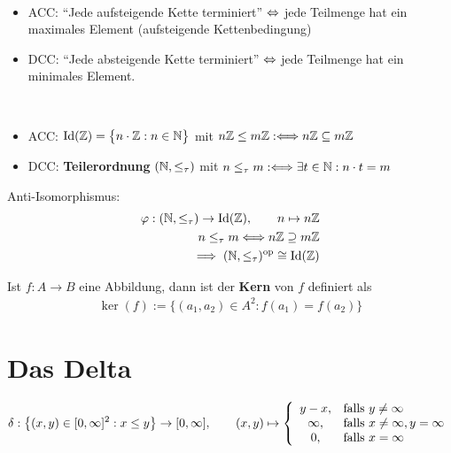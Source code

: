 \begin{bemerkung}\
\begin{itemize}
\item ACC: ``Jede aufsteigende Kette terminiert'' $\Leftrightarrow$ jede Teilmenge hat ein maximales Element (aufsteigende Kettenbedingung)
\item DCC: ``Jede absteigende Kette terminiert'' $\Leftrightarrow$ jede Teilmenge hat ein minimales Element.
\end{itemize}
\end{bemerkung}

\begin{beispiel}\
\begin{itemize}
\item ACC: $\text{Id}(\mathbb{Z})=\big\lbrace n\cdot\mathbb{Z}:n\in\mathbb{N}\big\rbrace$ mit $n\mathbb{Z}\leq m\mathbb{Z}:\Longleftrightarrow n\mathbb{Z}\subseteq m\mathbb{Z}$
\item DCC: \textbf{Teilerordnung} $(\mathbb{N},\leq_\tau)$ mit $n\leq_ \tau m:\Longleftrightarrow\exists t\in\mathbb{N}:n\cdot t=m$
\end{itemize}
Anti-Isomorphismus:
\begin{align*}
\varphi:(\mathbb{N},\leq_\tau)\to\text{Id}(\mathbb{Z}),\qquad n\mapsto n\mathbb{Z}\\
n\leq_\tau m\Longleftrightarrow n\mathbb{Z}\supseteq m\mathbb{Z}\\
\implies(\mathbb{N},\leq_\tau)^{\text{op}}\cong\text{Id}(\mathbb{Z})
\end{align*}
\end{beispiel}

\begin{definition}
Ist $f:A\to B$ eine Abbildung, dann ist der \textbf{Kern} von $f$ definiert als
\begin{align*}
\ker(f):=\big\lbrace(a_1,a_2)\in A^2:f(a_1)=f(a_2)\big\rbrace
\end{align*}
\end{definition}

\section{Das Delta}
\begin{definition}
\begin{align*}
\delta:\big\lbrace(x,y)\in[0,\infty]^2:x\leq y\big\rbrace\to[0,\infty],\qquad (x,y)\mapsto\left\lbrace\begin{array}{cl}
y-x,&\text{falls } y\neq\infty\\
\infty, &\text{falls } x\neq\infty,y=\infty\\
0, &\text{falls } x=\infty
\end{array}\right.
\end{align*}
\end{definition}

